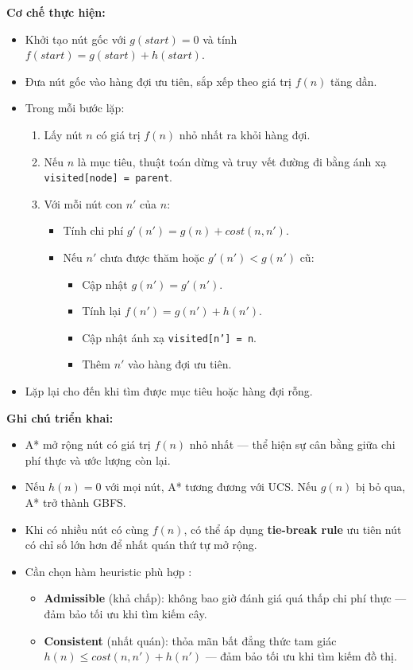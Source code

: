 \textbf{Cơ chế thực hiện:}
\begin{itemize}
    \item Khởi tạo nút gốc với $g(start) = 0$ và tính $f(start) = g(start) + h(start)$.
    \item Đưa nút gốc vào hàng đợi ưu tiên, sắp xếp theo giá trị $f(n)$ tăng dần.
    \item Trong mỗi bước lặp:
    \begin{enumerate}
        \item Lấy nút $n$ có giá trị $f(n)$ nhỏ nhất ra khỏi hàng đợi.
        \item Nếu $n$ là mục tiêu, thuật toán dừng và truy vết đường đi bằng ánh xạ \texttt{visited[node] = parent}.
        \item Với mỗi nút con $n'$ của $n$:
        \begin{itemize}
            \item Tính chi phí $g'(n') = g(n) + cost(n, n')$.
            \item Nếu $n'$ chưa được thăm hoặc $g'(n') < g(n')$ cũ:
            \begin{itemize}
                \item Cập nhật $g(n') = g'(n')$.
                \item Tính lại $f(n') = g(n') + h(n')$.
                \item Cập nhật ánh xạ \texttt{visited[n'] = n}.
                \item Thêm $n'$ vào hàng đợi ưu tiên.
            \end{itemize}
        \end{itemize}
    \end{enumerate}
    \item Lặp lại cho đến khi tìm được mục tiêu hoặc hàng đợi rỗng.
\end{itemize}

\textbf{Ghi chú triển khai:}
\begin{itemize}
    \item A* mở rộng nút có giá trị $f(n)$ nhỏ nhất — thể hiện sự cân bằng giữa chi phí thực và ước lượng còn lại.
    \item Nếu $h(n) = 0$ với mọi nút, A* tương đương với UCS.  
      Nếu $g(n)$ bị bỏ qua, A* trở thành GBFS.
    \item Khi có nhiều nút có cùng $f(n)$, có thể áp dụng \textbf{tie-break rule} ưu tiên nút có chỉ số lớn hơn để nhất quán thứ tự mở rộng.
    \item Cần chọn hàm heuristic phù hợp \cite{lecture2025}:
    \begin{itemize}
        \item \textbf{Admissible} (khả chấp): không bao giờ đánh giá quá thấp chi phí thực — đảm bảo tối ưu khi tìm kiếm cây.
        \item \textbf{Consistent} (nhất quán): thỏa mãn bất đẳng thức tam giác  
        $h(n) \leq cost(n, n') + h(n')$ — đảm bảo tối ưu khi tìm kiếm đồ thị.
    \end{itemize}
\end{itemize}

